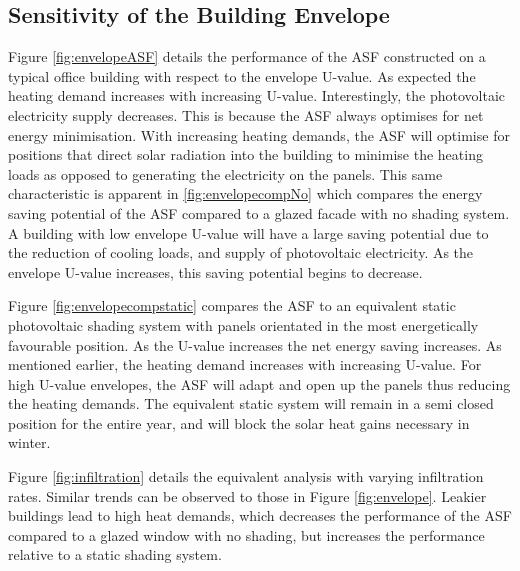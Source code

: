 
\subsection{Sensitivity of the Building Envelope}
\label{ch:envelope}

Figure \ref{fig:envelopeASF} details the performance of the ASF constructed on a typical office building with respect to the envelope U-value. As expected the heating demand increases with increasing U-value. Interestingly, the photovoltaic electricity supply decreases. This is because the ASF always optimises for net energy minimisation. With increasing heating demands, the ASF will optimise for positions that direct solar radiation into the building to minimise the heating loads as opposed to generating the electricity on the panels. This same characteristic is apparent in \ref{fig:envelopecompNo} which compares the energy saving potential of the ASF compared to a glazed facade with no shading system. A building with low envelope U-value will have a large saving potential due to the reduction of cooling loads, and supply of photovoltaic electricity. As the envelope U-value increases, this saving potential begins to decrease.

Figure \ref{fig:envelopecompstatic} compares the ASF to an equivalent static photovoltaic shading system with panels orientated in the most energetically favourable position. As the U-value increases the net energy saving increases. As mentioned earlier, the heating demand increases with increasing U-value. For high U-value envelopes, the ASF will adapt and open up the panels thus reducing the heating demands. The equivalent static system will remain in a semi closed position for the entire year, and will block the solar heat gains necessary in winter.

Figure \ref{fig:infiltration} details the equivalent analysis with varying infiltration rates. Similar trends can be observed to those in Figure \ref{fig:envelope}. Leakier buildings lead to high heat demands, which decreases the performance of the ASF compared to a glazed window with no shading, but increases the performance relative to a static shading system. 



